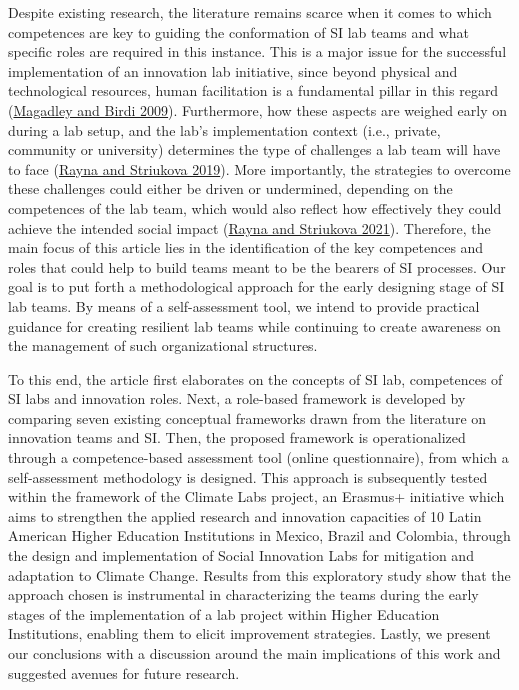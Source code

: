 \documentclass[AMA,STIX1COL,APA,STIX2COL]{WileyNJD-v2}
\begin{document}
Despite existing research, the literature remains scarce when it comes
to which competences are key to guiding the conformation of SI lab teams
and what specific roles are required in this instance. This is a major
issue for the successful implementation of an innovation lab initiative,
since beyond physical and technological resources, human facilitation is
a fundamental pillar in this regard
(\protect\hyperlink{ref-Magadley2009}{Magadley and Birdi 2009}).
Furthermore, how these aspects are weighed early on during a lab setup,
and the lab's implementation context (i.e., private, community or
university) determines the type of challenges a lab team will have to
face (\protect\hyperlink{ref-Rayna2019}{Rayna and Striukova 2019}). More
importantly, the strategies to overcome these challenges could either be
driven or undermined, depending on the competences of the lab team,
which would also reflect how effectively they could achieve the intended
social impact (\protect\hyperlink{ref-Rayna2021}{Rayna and Striukova
2021}). Therefore, the main focus of this article lies in the
identification of the key competences and roles that could help to build
teams meant to be the bearers of SI processes. Our goal is to put forth
a methodological approach for the early designing stage of SI lab teams.
By means of a self-assessment tool, we intend to provide practical
guidance for creating resilient lab teams while continuing to create
awareness on the management of such organizational structures.

To this end, the article first elaborates on the concepts of SI lab,
competences of SI labs and innovation roles. Next, a role-based
framework is developed by comparing seven existing conceptual frameworks
drawn from the literature on innovation teams and SI. Then, the proposed
framework is operationalized through a competence-based assessment tool
(online questionnaire), from which a self-assessment methodology is
designed. This approach is subsequently tested within the framework of
the Climate Labs project, an Erasmus+ initiative which aims to
strengthen the applied research and innovation capacities of 10 Latin
American Higher Education Institutions in Mexico, Brazil and Colombia,
through the design and implementation of Social Innovation Labs for
mitigation and adaptation to Climate Change. Results from this
exploratory study show that the approach chosen is instrumental in
characterizing the teams during the early stages of the implementation
of a lab project within Higher Education Institutions, enabling them to
elicit improvement strategies. Lastly, we present our conclusions with a
discussion around the main implications of this work and suggested
avenues for future research.
\end{document}
